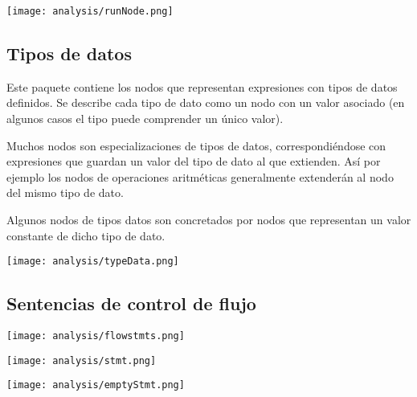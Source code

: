 \begin{center}
\texttt{[image: analysis/runNode.png]}
\end{center}
\begin{multicols}{2}
\subsection{Tipos de datos}
Este paquete contiene los nodos que representan expresiones con tipos de datos definidos.
Se describe cada tipo de dato como un nodo con un valor asociado (en algunos casos el tipo puede comprender un único valor).

Muchos nodos son especializaciones de tipos de datos, correspondiéndose con expresiones que 
guardan un valor del tipo de dato al que extienden. Así por ejemplo los nodos de operaciones aritméticas
generalmente extenderán al nodo del mismo tipo de dato. 

Algunos nodos de tipos datos son concretados por nodos que representan un valor constante de dicho tipo de dato.
\columnbreak
\begin{center}
\hfill\texttt{[image: analysis/typeData.png]}
\end{center}
\end{multicols}

\subsection{Sentencias de control de flujo}
\begin{center}
\texttt{[image: analysis/flowstmts.png]}
\end{center}

\begin{multicols}{2}
\begin{center}
\texttt{[image: analysis/stmt.png]} 
\end{center}
\columnbreak
\begin{center}
\texttt{[image: analysis/emptyStmt.png]} 
\end{center}
\end{multicols}

